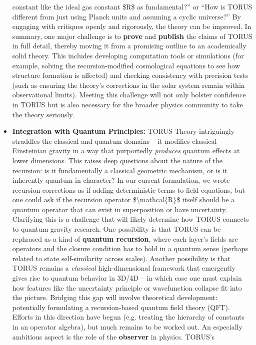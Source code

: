 \begin{itemize}
  constant like the ideal gas constant \$R\$ as fundamental?'' or ``How
  is TORUS different from just using Planck units and assuming a cyclic
  universe?'' By engaging with critiques openly and rigorously, the
  theory can be improved. In summary, one major challenge is to
  \textbf{prove} and \textbf{publish} the claims of TORUS in full
  detail, thereby moving it from a promising outline to an academically
  solid theory. This includes developing computation tools or
  simulations (for example, solving the recursion-modified cosmological
  equations to see how structure formation is affected​) and checking
  consistency with precision tests (such as ensuring the theory's
  corrections in the solar system remain within observational limits​).
  Meeting this challenge will not only bolster confidence in TORUS but
  is also necessary for the broader physics community to take the theory
  seriously.
\item
  \textbf{Integration with Quantum Principles:} TORUS Theory
  intriguingly straddles the classical and quantum domains -- it
  modifies classical Einsteinian gravity in a way that purportedly
  \emph{produces} quantum effects at lower dimensions. This raises deep
  questions about the nature of the recursion: is it fundamentally a
  classical geometric mechanism, or is it inherently quantum in
  character? In our current formulation, we wrote recursion corrections
  as if adding deterministic terms to field equations, but one could ask
  if the recursion operator \$\textbackslash{}mathcal\{R\}\$ itself
  should be a quantum operator that can exist in superposition or have
  uncertainty​. Clarifying this is a challenge that will likely
  determine how TORUS connects to quantum gravity research. One
  possibility is that TORUS can be rephrased as a kind of
  \textbf{quantum recursion}, where each layer's fields are operators
  and the closure condition has to hold in a quantum sense (perhaps
  related to state self-similarity across scales). Another possibility
  is that TORUS remains a \emph{classical} high-dimensional framework
  that emergently gives rise to quantum behavior in 3D/4D -- in which
  case one must explain how features like the uncertainty principle or
  wavefunction collapse fit into the picture. Bridging this gap will
  involve theoretical development: potentially formulating a
  recursion-based quantum field theory (QFT). Efforts in this direction
  have begun (e.g. treating the hierarchy of constants in an operator
  algebra), but much remains to be worked out. An especially ambitious
  aspect is the role of the \textbf{observer} in physics. TORUS's

\end{itemize}
